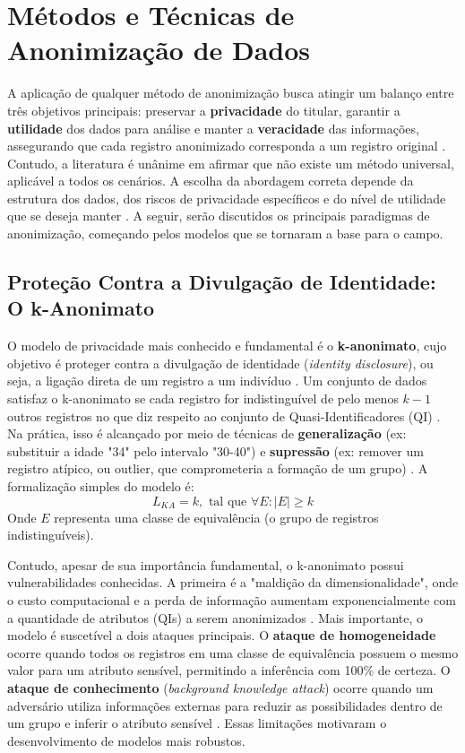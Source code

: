 \section{Métodos e Técnicas de Anonimização de Dados}
\label{sec:fund-metodos-anon}

A aplicação de qualquer método de anonimização busca atingir um balanço entre três objetivos principais: preservar a \textbf{privacidade} do titular, garantir a \textbf{utilidade} dos dados para análise e manter a \textbf{veracidade} das informações, assegurando que cada registro anonimizado corresponda a um registro original \cite{Olatunji2024}. Contudo, a literatura é unânime em afirmar que não existe um método universal, aplicável a todos os cenários. A escolha da abordagem correta depende da estrutura dos dados, dos riscos de privacidade específicos e do nível de utilidade que se deseja manter \cite{Vovk2023}. A seguir, serão discutidos os principais paradigmas de anonimização, começando pelos modelos que se tornaram a base para o campo.

\subsection{Proteção Contra a Divulgação de Identidade: O k-Anonimato}
\label{subsec:fund-k-anonimato}

O modelo de privacidade mais conhecido e fundamental é o \textbf{k-anonimato}, cujo objetivo é proteger contra a divulgação de identidade (\textit{identity disclosure}), ou seja, a ligação direta de um registro a um indivíduo \cite{Sepas2022, Vovk2023}. Um conjunto de dados satisfaz o k-anonimato se cada registro for indistinguível de pelo menos $k-1$ outros registros no que diz respeito ao conjunto de Quasi-Identificadores (QI) \cite{Zuo2021Data, Olatunji2024}. Na prática, isso é alcançado por meio de técnicas de \textbf{generalização} (ex: substituir a idade "34" pelo intervalo "30-40") e \textbf{supressão} (ex: remover um registro atípico, ou outlier, que comprometeria a formação de um grupo) \cite{Sepas2022}. A formalização simples do modelo é:
$$L_{KA} = k, \text{ tal que } \forall E : |E| \geq k$$
Onde $E$ representa uma classe de equivalência (o grupo de registros indistinguíveis).

Contudo, apesar de sua importância fundamental, o k-anonimato possui vulnerabilidades conhecidas. A primeira é a "maldição da dimensionalidade", onde o custo computacional e a perda de informação aumentam exponencialmente com a quantidade de atributos (QIs) a serem anonimizados \cite{Zuo2021Data}. Mais importante, o modelo é suscetível a dois ataques principais. O \textbf{ataque de homogeneidade} ocorre quando todos os registros em uma classe de equivalência possuem o mesmo valor para um atributo sensível, permitindo a inferência com 100\% de certeza. O \textbf{ataque de conhecimento} (\textit{background knowledge attack}) ocorre quando um adversário utiliza informações externas para reduzir as possibilidades dentro de um grupo e inferir o atributo sensível \cite{Zuo2021Data, Vovk2023}. Essas limitações motivaram o desenvolvimento de modelos mais robustos.

